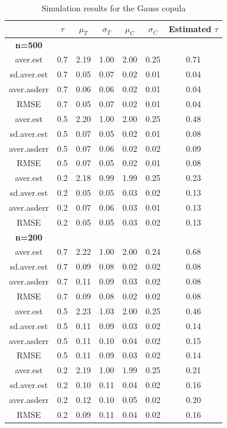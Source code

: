 \begin{table}[h]
    \centering
    \caption{Simulation results for the Gauss copula}
    \begin{tabular}{|c|c|c|c|c|c|c|}
        \hline
        & \(\tau\) & \(\mu_T\) & \(\sigma_T\) & \(\mu_C\) & \(\sigma_C\) & Estimated \(\tau\) \\ 
        \hline
        \textbf{n=500} & & & & & & \\
        \hline
        aver.est    & 0.7 & 2.19 & 1.00 & 2.00 & 0.25 & 0.71 \\ 
        sd.aver.est & 0.7 & 0.05 & 0.07 & 0.02 & 0.01 & 0.04 \\ 
        aver.asderr & 0.7 & 0.06 & 0.06 & 0.02 & 0.01 & 0.04 \\ 
        RMSE        & 0.7 & 0.05 & 0.07 & 0.02 & 0.01 & 0.04 \\ 
        \hline
        aver.est    & 0.5 & 2.20 & 1.00 & 2.00 & 0.25 & 0.48 \\ 
        sd.aver.est & 0.5 & 0.07 & 0.05 & 0.02 & 0.01 & 0.08 \\ 
        aver.asderr & 0.5 & 0.07 & 0.06 & 0.02 & 0.02 & 0.09 \\ 
        RMSE        & 0.5 & 0.07 & 0.05 & 0.02 & 0.01 & 0.08 \\ 
        \hline
        aver.est    & 0.2 & 2.18 & 0.99 & 1.99 & 0.25 & 0.23 \\ 
        sd.aver.est & 0.2 & 0.05 & 0.05 & 0.03 & 0.02 & 0.13 \\ 
        aver.asderr & 0.2 & 0.07 & 0.06 & 0.03 & 0.01 & 0.13 \\ 
        RMSE        & 0.2 & 0.05 & 0.05 & 0.03 & 0.02 & 0.13 \\ 
        \hline
        \textbf{n=200} & & & & & & \\
        \hline
        aver.est    & 0.7 & 2.22 & 1.00 & 2.00 & 0.24 & 0.68 \\ 
        sd.aver.est & 0.7 & 0.09 & 0.08 & 0.02 & 0.02 & 0.08 \\ 
        aver.asderr & 0.7 & 0.11 & 0.09 & 0.03 & 0.02 & 0.08 \\ 
        RMSE        & 0.7 & 0.09 & 0.08 & 0.02 & 0.02 & 0.08 \\ 
        \hline
        aver.est    & 0.5 & 2.23 & 1.03 & 2.00 & 0.25 & 0.46 \\ 
        sd.aver.est & 0.5 & 0.11 & 0.09 & 0.03 & 0.02 & 0.14 \\ 
        aver.asderr & 0.5 & 0.11 & 0.10 & 0.04 & 0.02 & 0.15 \\ 
        RMSE        & 0.5 & 0.11 & 0.09 & 0.03 & 0.02 & 0.14 \\ 
        \hline
        aver.est    & 0.2 & 2.19 & 1.00 & 1.99 & 0.25 & 0.21 \\ 
        sd.aver.est & 0.2 & 0.10 & 0.11 & 0.04 & 0.02 & 0.16 \\ 
        aver.asderr & 0.2 & 0.12 & 0.10 & 0.05 & 0.02 & 0.20 \\ 
        RMSE        & 0.2 & 0.09 & 0.11 & 0.04 & 0.02 & 0.16 \\ 
        \hline
    \end{tabular}
    \label{tab:gauss_results}
\end{table}